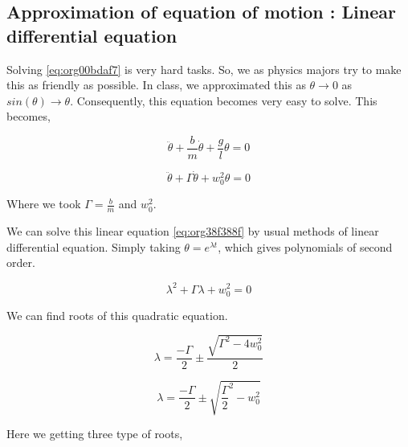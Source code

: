 \documentclass[11pt,a4paper]{article}
\begin{document}
\subsection{Approximation of equation of motion : Linear differential equation}
\label{sec:org0518d21}

Solving \ref{eq:org00bdaf7} is very hard tasks. So, we as physics majors try to make this as friendly as possible. In class, we approximated this as \(\theta \to 0\) as \(sin(\theta) \to \theta\). Consequently, this equation becomes very easy to solve. This becomes,

\begin{equation}
\label{eq:org2a3279e}
\ddot{\theta}+\frac{b}{m}\dot{\theta}+\frac{g}{l}\theta=0
\end{equation}

\begin{equation}
\label{eq:org38f388f}
\ddot{\theta}+\Gamma\dot{\theta}+w_{0}^{2}\theta=0
\end{equation}

Where we took \(\Gamma = \frac{b}{m}\) and \(w_{0}^{2}\).

We can solve this linear equation \ref{eq:org38f388f} by usual methods of linear differential equation. Simply taking \(\theta=e^{\lambda t}\), which gives polynomials of second order.

\begin{equation}
\label{eq:org6d5f5aa}
\lambda^{2}+\Gamma\lambda+w_{0}^{2}=0
\end{equation}

We can find roots of this quadratic equation.

\begin{equation}
\label{eq:org4a1c80c}
\lambda = \frac{-\Gamma}{2} \pm \frac{\sqrt{\Gamma^{2}-4w_{0}^{2}}}{2}
\end{equation}

\begin{equation}
\label{eq:org29a5e8b}
\lambda = \frac{-\Gamma}{2} \pm \sqrt{\frac{\Gamma}{2}^{2}-w_{0}^{2}}
\end{equation}

Here we getting three type of roots,
\end{document}
